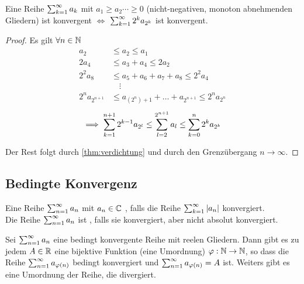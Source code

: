 \setcounter{thm}{15}
\begin{thm}[Verdichtung]
	\label{thm:verdichtung}
	Eine Reihe $\sum_{k=1}^{\infty} a_k$ mit $a_1 \geq a_2 \cdots \geq 0$ (nicht-negativen, monoton abnehmenden Gliedern) ist konvergent $\iff$ $\sum_{k=1}^{\infty} 2^k a_{2^k}$ ist konvergent.
\end{thm}
\begin{proof}
	Es gilt $\forall n\in \mathbb{N}$
	\begin{equation}
		\begin{aligned}
			a_2    &\leq a_2 \leq a_1 \\
			2a_4   &\leq a_3+a_4 \leq 2a_2 \\
			2^2a_8 &\leq a_5+a_6+a_7+a_8 \leq 2^2a_4 \\
			       &\quad \vdots \\
			2^{n} a_{2^{n+1}} & \leq a_{(2^n)+1} + \ldots + a_{2^{n+1}} \leq 2^n a_{2^n}
		\end{aligned}
	\end{equation}
	\begin{equation}
		\implies \sum_{k=1}^{n+1} 2^{k-1} a_{2^l} \leq \sum_{l=2}^{2^{n+1}} a_l \leq \sum_{k=0}^{n} 2^{k}a_{2^k}
	\end{equation}

	Der Rest folgt durch \autoref{thm:verdichtung} und durch den Grenzübergang $n \to \infty$.
\end{proof}


\subsection{Bedingte Konvergenz}
\begin{mydef}
	Eine Reihe $\sum_{n=1}^{\infty} a_n$ mit $a_n \in \mathbb{C}$ , falls die Reihe $\sum_{k=1}^{\infty} |a_n|$ konvergiert. \\
Die Reihe $\sum_{n=1}^{\infty} a_n$ ist , falls sie konvergiert, aber nicht absolut konvergiert.
\end{mydef}

\setcounter{thm}{20}
\begin{thm}
	Sei $\sum_{n=1}^{\infty} a_n$ eine bedingt konvergente Reihe mit reelen Gliedern. Dann gibt es zu jedem $A\in \mathbb{R}$ eine bijektive Funktion (eine Umordnung) $\varphi: \mathbb{N} \to \mathbb{N}$, so dass die Reihe $\sum_{n=1}^{\infty} a_{\varphi(n)}$ bedingt konvergiert und $\sum_{n=1}^{\infty} a_{\varphi(n)} = A$ ist. Weiters gibt es eine Umordnung der Reihe, die divergiert.
\end{thm}


